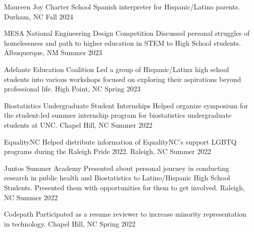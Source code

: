 
{}

\begin{cvhonors}

  \cvhonor
    {Maureen Joy Charter School} %
    {Spanish interpreter for Hispanic/Latino parents.} %
    {Durham, NC} %
    {Fall 2024} %

      \cvhonor
    {MESA National Engineering Design Competition} %
    {Discussed personal struggles of homelessness and path to higher education in STEM to High School students.} %
    {Albuquerque, NM} %
    {Summer 2023} %
    
  \cvhonor
    {Adelante Education Coalition} %
    {Led a group of Hispanic/Latinx high school students into various workshops focused on exploring their aspirations beyond professional life.} %
    {High Point, NC} %
    {Spring 2023} %
  
  \cvhonor
    {Biostatistics Undergraduate Student Internships} %
    {Helped organize symposium for the student-led summer internship program for biostatistics undergraduate students at UNC.} %
    {Chapel Hill, NC} %
    {Summer 2022} %


  \cvhonor
    {EqualityNC} %
    {Helped distribute information of EqualityNC's support LGBTQ programs during the Raleigh Pride 2022.} %
    {Raleigh, NC} %
    {Summer 2022} %

  \cvhonor
    {Juntos Summer Academy} %
    {Presented about personal journey in conducting research in public health and Biostatistics to Latino/Hispanic High School Students. Presented them with opportunities for them to get involved.} %
    {Raleigh, NC} %
    {Summer 2022} %
    
  \cvhonor
    {Codepath} %
    {Participated as a resume reviewer to increase minority representation in technology.} %
    {Chapel Hill, NC} %
    {Spring 2022} %

  
  

\end{cvhonors}


